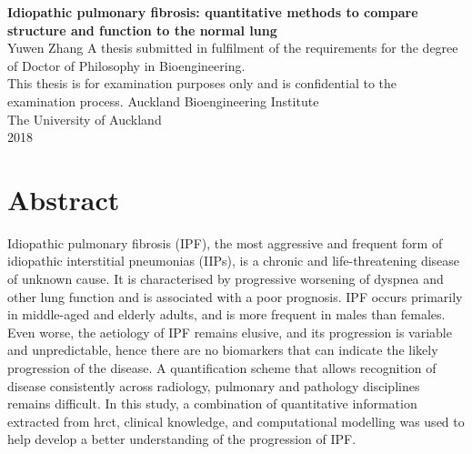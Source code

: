 \documentclass[a4paper, 12pt]{book}
\begin{document}
\frontmatter

\begin{titlepage}
  \begin{center}
    \vfill
    {\Large \textbf{Idiopathic pulmonary fibrosis: quantitative methods to compare structure and function to the normal lung}} %
    \\[6cm]
    Yuwen Zhang
    \vfill
    \normalsize A thesis submitted in fulfilment of the requirements for the degree of Doctor of Philosophy in Bioengineering. \\[1cm]
    This thesis is for examination purposes only and is confidential to the examination process.
    \vfill
    Auckland Bioengineering Institute
    \\[0.8cm] The University of Auckland
    \\[0.8cm] 2018
  \end{center}
\end{titlepage}

\cleardoublepage
\chapter*{Abstract}
Idiopathic pulmonary fibrosis (IPF), the most aggressive and frequent form of idiopathic interstitial pneumonias (IIPs), is a chronic and life-threatening disease of unknown cause. It is characterised by progressive worsening of dyspnea and other lung function and is associated with a poor prognosis. IPF occurs primarily in middle-aged and elderly adults, and is more frequent in males than females. Even worse, the aetiology of IPF remains elusive, and its progression is variable and unpredictable, hence there are no biomarkers that can indicate the likely progression of the disease. A quantification scheme that allows recognition of disease consistently across radiology, pulmonary and pathology disciplines remains difficult. In this study, a combination of quantitative information extracted from \gls{hrct}, clinical knowledge, and computational modelling was used to help develop a better understanding of the progression of IPF.
\end{document}
